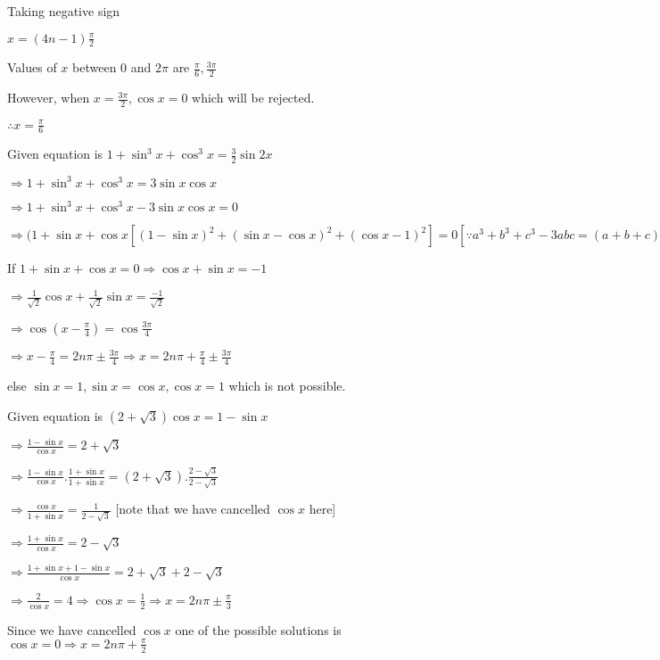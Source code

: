   Taking negative sign

  $x = (4n - 1)\frac{\pi}{2}$

  Values of $x$ between $0$ and $2\pi$ are $\frac{\pi}{6}, \frac{3\pi}{2}$

  However, when $x = \frac{3\pi}{2}, \cos x = 0$ which will be rejected.

  $\therefore x = \frac{\pi}{6}$

\item Given equation is $1 + \sin^3x + \cos^3x = \frac{3}{2}\sin2x$

  $\Rightarrow 1 + \sin^3x + \cos^3x = 3\sin x\cos x$

  $\Rightarrow 1 + \sin^3x + \cos^3x - 3\sin x\cos x = 0$

  $\Rightarrow (1 + \sin x+\cos x[(1 - \sin x)^2 + (\sin x - \cos x)^2 + (\cos x - 1)^2] = 0[\because a^3 + b^3 + c^3 -
  3abc = (a + b + c).\frac{1}{2}[(a - b)^2 + (b - c)^2 + (c - a)^3]]$

  If $1 + \sin x + \cos x = 0 \Rightarrow \cos x + \sin x = -1$

  $\Rightarrow \frac{1}{\sqrt{2}}\cos x + \frac{1}{\sqrt{2}}\sin x = \frac{-1}{\sqrt{2}}$

  $\Rightarrow \cos\left(x - \frac{\pi}{4}\right) = \cos\frac{3\pi}{4}$

  $\Rightarrow x - \frac{\pi}{4} = 2n\pi \pm\frac{3\pi}{4} \Rightarrow x = 2n\pi + \frac{\pi}{4}\pm \frac{3\pi}{4}$

  else $\sin x = 1, \sin x = \cos x, \cos x = 1$ which is not possible.

\item Given equation is $(2 + \sqrt{3})\cos x = 1 - \sin x$

  $\Rightarrow \frac{1 - \sin x}{\cos x} = 2 + \sqrt{3}$

  $\Rightarrow \frac{1 - \sin x}{\cos x}.\frac{1 + \sin x}{1 + \sin x} = (2 + \sqrt{3}).\frac{2 - \sqrt{3}}{2 - \sqrt{3}}$

  $\Rightarrow \frac{\cos x}{1 + \sin x} = \frac{1}{2 - \sqrt{3}}$ [note that we have cancelled $\cos x$ here]

  $\Rightarrow \frac{1 + \sin x}{\cos x} = 2 - \sqrt{3}$

  $\Rightarrow \frac{1 + \sin x + 1 - \sin x}{\cos x} = 2 + \sqrt{3} + 2 - \sqrt{3}$

  $\Rightarrow \frac{2}{\cos x} = 4 \Rightarrow \cos x = \frac{1}{2} \Rightarrow x = 2n\pi \pm \frac{\pi}{3}$

  Since we have cancelled $\cos x$ one of the possible solutions is $\cos x = 0 \Rightarrow x = 2n\pi + \frac{\pi}{2}$

